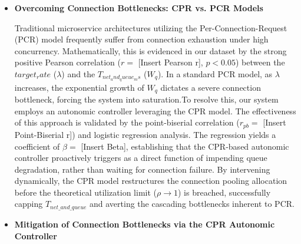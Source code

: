 \documentclass{article}
\begin{document}
\begin{itemize}
$$Trigger \rightarrow True \quad \text{if} \quad \rho \ge \rho_{crit} \quad \text{or} \quad W_q(\lambda_{t+1}) > SLA_{threshold}$$

Upon triggering, the autonomic mechanism intervenes proactively—typically by scaling the number of resources ($c \to c'$) or applying backpressure to throttle incoming requests ($\lambda \to \lambda'$). By dynamically increasing the denominator ($c'\mu$) or capping the numerator ($\lambda'$), the controller artificially forces $\rho$ back to a stable state ($\rho < \rho_{crit}$), effectively neutralizing the exponential queuing delay before the physical system exhibits SLA violations.

\item \textbf{Overcoming Connection Bottlenecks: CPR vs. PCR Models} 

Traditional microservice architectures utilizing the Per-Connection-Request (PCR) model frequently suffer from connection exhaustion under high concurrency. Mathematically, this is evidenced in our dataset by the strong positive Pearson correlation ($r =$ [Insert Pearson r], $p < 0.05$) between the $target_rate$ ($\lambda$) and the $T_{net_and_queue_ms}$ ($W_q$). In a standard PCR model, as $\lambda$ increases, the exponential growth of $W_q$ dictates a severe connection bottleneck, forcing the system into saturation.To resolve this, our system employs an autonomic controller leveraging the CPR model. The effectiveness of this approach is validated by the point-biserial correlation ($r_{pb} =$ [Insert Point-Biserial r]) and logistic regression analysis. The regression yields a coefficient of $\beta =$ [Insert Beta], establishing that the CPR-based autonomic controller proactively triggers as a direct function of impending queue degradation, rather than waiting for connection failure. By intervening dynamically, the CPR model restructures the connection pooling allocation before the theoretical utilization limit ($\rho \to 1$) is breached, successfully capping $T_{net\_and\_queue}$ and averting the cascading bottlenecks inherent to PCR.

\item \textbf{Mitigation of Connection Bottlenecks via the CPR Autonomic Controller}


\end{itemize}
\end{document}
